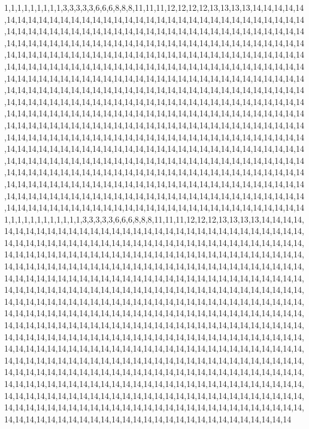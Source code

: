 1,1,1,1,1,1,1,1,1,3,3,3,3,3,6,6,6,8,8,8,11,11,11,12,12,12,12,13,13,13,13,14,14,14,14,14,14,14,14,14,14,14,14,14,14,14,14,14,14,14,14,14,14,14,14,14,14,14,14,14,14,14,14,14,14,14,14,14,14,14,14,14,14,14,14,14,14,14,14,14,14,14,14,14,14,14,14,14,14,14,14,14,14,14,14,14,14,14,14,14,14,14,14,14,14,14,14,14,14,14,14,14,14,14,14,14,14,14,14,14,14,14,14,14,14,14,14,14,14,14,14,14,14,14,14,14,14,14,14,14,14,14,14,14,14,14,14,14,14,14,14,14,14,14,14,14,14,14,14,14,14,14,14,14,14,14,14,14,14,14,14,14,14,14,14,14,14,14,14,14,14,14,14,14,14,14,14,14,14,14,14,14,14,14,14,14,14,14,14,14,14,14,14,14,14,14,14,14,14,14,14,14,14,14,14,14,14,14,14,14,14,14,14,14,14,14,14,14,14,14,14,14,14,14,14,14,14,14,14,14,14,14,14,14,14,14,14,14,14,14,14,14,14,14,14,14,14,14,14,14,14,14,14,14,14,14,14,14,14,14,14,14,14,14,14,14,14,14,14,14,14,14,14,14,14,14,14,14,14,14,14,14,14,14,14,14,14,14,14,14,14,14,14,14,14,14,14,14,14,14,14,14,14,14,14,14,14,14,14,14,14,14,14,14,14,14,14,14,14,14,14,14,14,14,14,14,14,14,14,14,14,14,14,14,14,14,14,14,14,14,14,14,14,14,14,14,14,14,14,14,14,14,14,14,14,14,14,14,14,14,14,14,14,14,14,14,14,14,14,14,14,14,14,14,14,14,14,14,14,14,14,14,14,14,14,14,14,14,14,14,14,14,14,14,14,14,14,14,14,14,14,14,14,14,14,14,14,14,14,14,14,14,14,14,14,14,14,14,14,14,14,14,14,14,14,14,14,14,14,14,14,14,14,14,14,14,14,14,14,14,14,14,14,14,14,14,14,14,14,14,14,14,14,14,14,14,14,14,14,14,14,14,14,14,14,14,14,14,14,14,14,14,14,14,14,14,14,14,14,14,14,14,14,14,14,14,14,14,14,14,14,14,14,14,14,14,14,14,14,14,14,14
1,1,1,1,1,1,1,1,1,1,1,1,3,3,3,3,3,6,6,6,8,8,8,11,11,11,12,12,12,13,13,13,13,14,14,14,14,14,14,14,14,14,14,14,14,14,14,14,14,14,14,14,14,14,14,14,14,14,14,14,14,14,14,14,14,14,14,14,14,14,14,14,14,14,14,14,14,14,14,14,14,14,14,14,14,14,14,14,14,14,14,14,14,14,14,14,14,14,14,14,14,14,14,14,14,14,14,14,14,14,14,14,14,14,14,14,14,14,14,14,14,14,14,14,14,14,14,14,14,14,14,14,14,14,14,14,14,14,14,14,14,14,14,14,14,14,14,14,14,14,14,14,14,14,14,14,14,14,14,14,14,14,14,14,14,14,14,14,14,14,14,14,14,14,14,14,14,14,14,14,14,14,14,14,14,14,14,14,14,14,14,14,14,14,14,14,14,14,14,14,14,14,14,14,14,14,14,14,14,14,14,14,14,14,14,14,14,14,14,14,14,14,14,14,14,14,14,14,14,14,14,14,14,14,14,14,14,14,14,14,14,14,14,14,14,14,14,14,14,14,14,14,14,14,14,14,14,14,14,14,14,14,14,14,14,14,14,14,14,14,14,14,14,14,14,14,14,14,14,14,14,14,14,14,14,14,14,14,14,14,14,14,14,14,14,14,14,14,14,14,14,14,14,14,14,14,14,14,14,14,14,14,14,14,14,14,14,14,14,14,14,14,14,14,14,14,14,14,14,14,14,14,14,14,14,14,14,14,14,14,14,14,14,14,14,14,14,14,14,14,14,14,14,14,14,14,14,14,14,14,14,14,14,14,14,14,14,14,14,14,14,14,14,14,14,14,14,14,14,14,14,14,14,14,14,14,14,14,14,14,14,14,14,14,14,14,14,14,14,14,14,14,14,14,14,14,14,14,14,14,14,14,14,14,14,14,14,14,14,14,14,14,14,14,14,14,14,14,14,14,14,14,14,14,14,14,14,14,14,14,14,14,14,14,14,14,14,14,14,14,14,14,14,14,14,14,14,14,14,14,14,14,14,14,14,14,14,14,14,14,14,14,14,14,14,14,14,14,14,14,14,14,14,14,14,14,14,14,14,14,14,14,14,14,14,14,14,14,14,14,14,14,14,14,14,14,14,14,14,14,14,14
